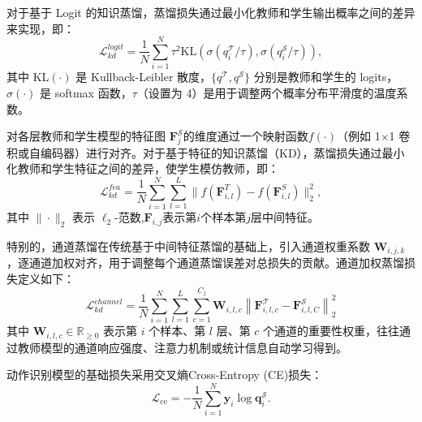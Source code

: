 \documentclass[10.5pt,letterpaper]{article}
\begin{document}
对于基于 Logit 的知识蒸馏，蒸馏损失通过最小化教师和学生输出概率之间的差异来实现，即：
\begin{equation}
\mathcal{L}_{kd}^{logit} = \frac{1}{N} \sum_{i=1}^N \tau^2 \text{KL}(\sigma(q^\mathcal{T}_i / \tau), \sigma(q^\mathcal{S}_i / \tau)),
\label{logit}
\end{equation}
其中 $\text{KL}(\cdot)$ 是 Kullback-Leibler 散度，$\{q^\mathcal{T}, q^\mathcal{S}\}$ 分别是教师和学生的 logits，$\sigma(\cdot)$ 是 softmax 函数，$\tau$（设置为 4）是用于调整两个概率分布平滑度的温度系数。

对各层教师和学生模型的特征图 $\textbf{F}_j^\mathcal{S}$的维度通过一个映射函数$f(\cdot)$（例如 1$\times$1 卷积或自编码器）进行对齐。对于基于特征的知识蒸馏（KD），蒸馏损失通过最小化教师和学生特征之间的差异，使学生模仿教师，即：
\begin{equation}
\mathcal{L}_{kd}^{fea} = \frac{1}{N} \sum_{i=1}^N \sum_{l=1}^L\| f(\textbf{F}^T_{i,l}) - f(\textbf{F}^S_{i,l}) \|_2^2,
\end{equation}
其中 $\|\cdot\|_2$ 表示 $\ell_2$-范数,$\textbf{F}_{i,j}$表示第$i$个样本第$j$层中间特征。

特别的，通道蒸馏在传统基于中间特征蒸馏的基础上，引入通道权重系数 $\textbf{W}_{i,j,k}$，逐通道加权对齐，用于调整每个通道蒸馏误差对总损失的贡献。通道加权蒸馏损失定义如下：
\begin{equation}
\mathcal{L}_{kd}^{channel} = \frac{1}{N} \sum_{i=1}^{N} \sum_{l=1}^{L} \sum_{c=1}^{C_j} \textbf{W}_{i,l,c} \left\| \textbf{F}^{\mathcal{T}}_{i,l,c} - \textbf{F}^{\mathcal{S}}_{i,l,C} \right\|_2^2
\end{equation}
其中 $\textbf{W}_{i,l,c} \in \mathbb{R}_{\ge 0}$ 表示第 $i$ 个样本、第 $l$ 层、第 $c$ 个通道的重要性权重，往往通过教师模型的通道响应强度、注意力机制或统计信息自动学习得到。



动作识别模型的基础损失采用交叉熵Cross-Entropy (CE)损失：
\begin{equation}
\mathcal{L}_{\text{ce}} = -\frac{1}{N} \sum_{i=1}^N \textbf{y}_i \log \textbf{q}^\mathcal{S}_i.
\label{ce_loss}
\end{equation}
\end{document}
